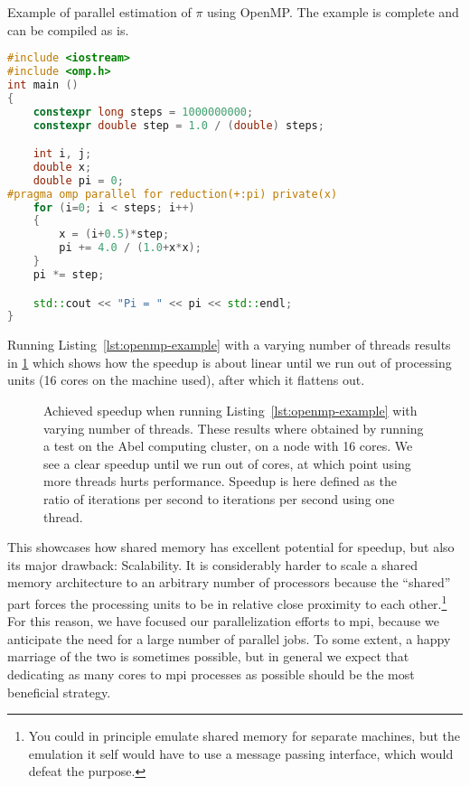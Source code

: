 \documentclass[Thesis.tex]{subfiles}
\begin{document}
\begin{lstfloat}
  \centering
  \caption{Example of parallel estimation of
$\pi$ using OpenMP. The example is complete and can be compiled as is.}
\begin{lstlisting}[language=C++, label={lst:openmp-example}]
#include <iostream>
#include <omp.h>
int main ()
{
    constexpr long steps = 1000000000;
    constexpr double step = 1.0 / (double) steps;

    int i, j;
    double x;
    double pi = 0;
#pragma omp parallel for reduction(+:pi) private(x)
    for (i=0; i < steps; i++)
    {
        x = (i+0.5)*step;
        pi += 4.0 / (1.0+x*x);
    }
    pi *= step;

    std::cout << "Pi = " << pi << std::endl;
}
\end{lstlisting}
\end{lstfloat}

Running Listing~\ref{lst:openmp-example} with a varying number of threads
results in \cref{fig:openmp-example} which shows how the speedup is about linear
until we run out of processing units (16 cores on the machine used), after which
it flattens out.

\begin{figure}[h]
  \centering
    \resizebox{0.7\linewidth}{!}{%
        
    }
  \caption[Speedup using OpenMP parallelization]{Achieved speedup when
    running Listing~\ref{lst:openmp-example} with
    varying number of threads. These results where obtained by running a test
    on the Abel computing cluster, on a node with 16 cores. We see a clear
    speedup until we run out of cores, at which point using more threads hurts
    performance. Speedup is here defined as the ratio of iterations per second
    to iterations per second using one thread.}
  \label{fig:openmp-example}
\end{figure}

This showcases how shared memory has excellent potential for speedup, but also
its major drawback: Scalability. It is considerably harder to scale a shared
memory architecture to an arbitrary number of processors because the ``shared''
part forces the processing units to be in relative close proximity to each
other.\footnote{You could in principle emulate shared memory for separate
  machines, but the emulation it self would have to use a message passing
  interface, which would defeat the purpose.} For this reason, we have focused
our parallelization efforts to \gls{mpi}, because we anticipate the need for a large
number of parallel jobs. To some extent, a happy marriage of the two is
sometimes possible, but in general we expect that dedicating as many cores to
\gls{mpi} processes as possible should be the most beneficial strategy.
\end{document}
